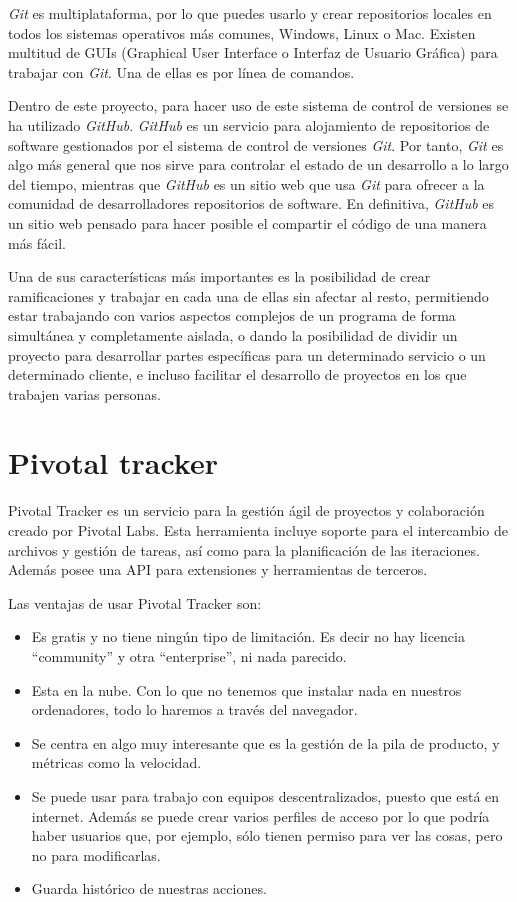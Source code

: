 \documentclass[a4paper, 12pt]{book}
\begin{document}
\textit{Git} es multiplataforma, por lo que puedes usarlo y crear repositorios locales en todos los sistemas operativos m\'as comunes, Windows, Linux o Mac. 
Existen multitud de GUIs (Graphical User Interface o Interfaz de Usuario Gr\'afica) para trabajar con \textit{Git}. Una de ellas es por l\'inea de comandos.

Dentro de este proyecto, para hacer uso de este sistema de control de versiones se ha utilizado \textit{GitHub}. \textit{GitHub} es un servicio para alojamiento de 
repositorios de software gestionados por el sistema de control de versiones \textit{Git}. Por tanto, \textit{Git} es algo m\'as general que nos sirve para controlar 
el estado de un desarrollo a lo largo del tiempo, mientras que \textit{GitHub} es un sitio web que usa \textit{Git} para ofrecer a la comunidad de desarrolladores 
repositorios de software. En definitiva, \textit{GitHub} es un sitio web pensado para hacer posible el compartir el c\'odigo de una manera m\'as f\'acil.

Una de sus caracter\'isticas m\'as importantes es la posibilidad de crear ramificaciones y trabajar en cada una de ellas sin afectar al resto, permitiendo 
estar trabajando con varios aspectos complejos de un programa de forma simult\'anea y completamente aislada, o dando la posibilidad de dividir un proyecto 
para desarrollar partes espec\'ificas para un determinado servicio o un determinado cliente, e incluso facilitar el desarrollo de proyectos en los que 
trabajen varias personas.

\section{Pivotal tracker}
\label{sec:pivotal}
Pivotal Tracker es un servicio para la gesti\'on \'agil de proyectos y colaboraci\'on creado por Pivotal Labs. Esta herramienta incluye soporte 
para el intercambio de archivos y gesti\'on de tareas, as\'i como para la planificaci\'on de las iteraciones. Adem\'as posee una API para extensiones y 
herramientas de terceros.

Las ventajas de usar Pivotal Tracker son:
\begin{itemize}
  \item Es gratis y no tiene ning\'un tipo de limitaci\'on. Es decir no hay licencia ``community'' y otra ``enterprise'', ni nada parecido.
  \item Esta en la nube. Con lo que no tenemos que instalar nada en nuestros ordenadores, todo lo haremos a trav\'es del navegador.
  \item Se centra en algo muy interesante que es la gesti\'on de la pila de producto, y m\'etricas como la velocidad.
  \item Se puede usar para trabajo con equipos descentralizados, puesto que est\'a en internet. Adem\'as se puede crear varios perfiles de acceso por 
  lo que podr\'ia haber usuarios que, por ejemplo, s\'olo tienen permiso para ver las cosas, pero no para modificarlas.
  \item Guarda hist\'orico de nuestras acciones.
\end{itemize}
\end{document}
